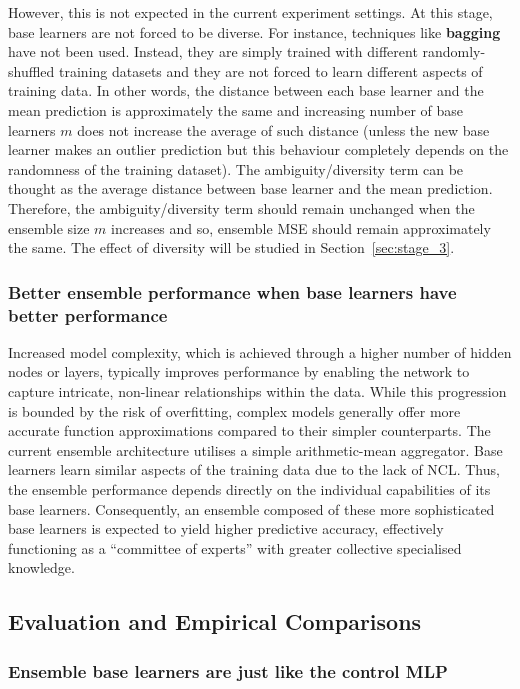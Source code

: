 \documentclass{article}
\begin{document}
However, this is not expected in the current experiment settings. At this stage, base learners are not forced to be diverse. For instance, techniques like \textbf{bagging} have not been used. Instead, they are simply trained with different randomly-shuffled training datasets and they are not forced to learn different aspects of training data. In other words, the distance between each base learner and the mean prediction is approximately the same and increasing number of base learners $m$ does not increase the average of such distance (unless the new base learner makes an outlier prediction but this behaviour completely depends on the randomness of the training dataset). The ambiguity/diversity term can be thought as the average distance between base learner and the mean prediction. Therefore, the ambiguity/diversity term should remain unchanged when the ensemble size $m$ increases and so, ensemble MSE should remain approximately the same. The effect of diversity will be studied in Section~\ref{sec:stage_3}. 


\subsubsection{Better ensemble performance when base learners have better performance}
Increased model complexity, which is achieved through a higher number of hidden nodes or layers, typically improves performance by enabling the network to capture intricate, non-linear relationships within the data. While this progression is bounded by the risk of overfitting, complex models generally offer more accurate function approximations compared to their simpler counterparts. The current ensemble architecture utilises a simple arithmetic-mean aggregator. Base learners learn similar aspects of the training data due to the lack of NCL. Thus, the ensemble performance depends directly on the individual capabilities of its base learners. Consequently, an ensemble composed of these more sophisticated base learners is expected to yield higher predictive accuracy, effectively functioning as a ``committee of experts'' with greater collective specialised knowledge. 


\subsection{Evaluation and Empirical Comparisons}


\subsubsection{Ensemble base learners are just like the control MLP}
\end{document}
